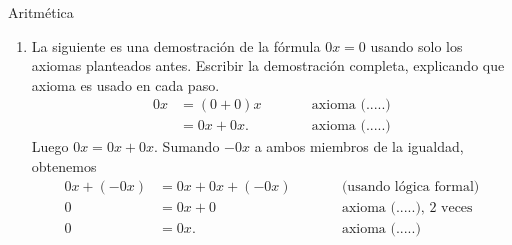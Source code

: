 \begin{section}{Aritmética}
\begin{enumerate}[1)]
\item \label{ej0a}
La siguiente es una demostración de la fórmula $0x=0$ usando solo los axiomas planteados antes. Escribir la demostración completa, explicando que axioma es usado en cada paso.
$$\begin{aligned}
0x &= (0+0)x &\qquad &\mbox{axioma (.....)}\\  
&=0x+0x. &\qquad &\mbox{axioma (.....)}
\end{aligned}$$
Luego $0x =0x+0x$. Sumando $-0x$ a ambos miembros de la igualdad, obtenemos 
$$\begin{aligned}
0x +(-0x) &= 0x+0x+(-0x) &\qquad &\mbox{(usando lógica formal)}\\  
0 &= 0x+0 &\qquad &\mbox{axioma (.....), 2 veces}\\  
0 &=0x. &\qquad &\mbox{axioma (.....)}
\end{aligned}$$
\end{enumerate}

\end{section}



